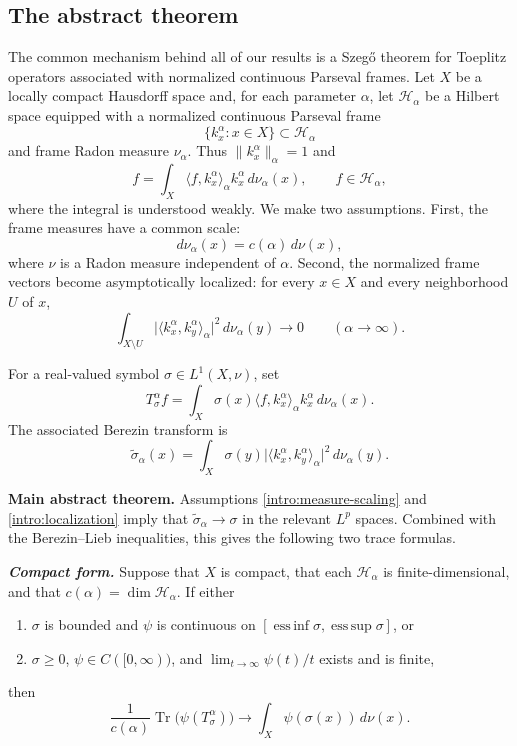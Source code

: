 \documentclass{amsart}
\theoremstyle{definition}
\theoremstyle{remark}
\numberwithin{equation}{section}
\begin{document}
\subsection{The abstract theorem}

The common mechanism behind all of our results is a Szeg\H{o} theorem for
Toeplitz operators associated with normalized continuous Parseval frames.
Let $X$ be a locally compact Hausdorff space and, for each parameter
$\alpha$, let $\mathcal{H}_\alpha$ be a Hilbert space equipped with a normalized
continuous Parseval frame
\[
  \{k_x^\alpha:x\in X\}\subset \mathcal{H}_\alpha
\]
and frame Radon measure $\nu_\alpha$.  Thus $\|k_x^\alpha\|_\alpha=1$ and
\[
  f=\int_X \langle f,k_x^\alpha\rangle_\alpha k_x^\alpha\,d\nu_\alpha(x),
  \qquad f\in \mathcal{H}_\alpha,
\]
where the integral is understood weakly.  We make two assumptions.
First, the frame measures have a common scale:
\begin{equation}
  d\nu_\alpha(x)=c(\alpha)\,d\nu(x),
  \label{intro:measure-scaling}
\end{equation}
where $\nu$ is a Radon measure independent of $\alpha$.  Second, the normalized frame
vectors become asymptotically localized: for every $x\in X$ and every
neighborhood $U$ of $x$,
\begin{equation}
  \int_{X\setminus U}
  \bigl|\langle k_x^\alpha,k_y^\alpha\rangle_\alpha\bigr|^2
  \,d\nu_\alpha(y)\longrightarrow 0
  \qquad (\alpha\to\infty).
  \label{intro:localization}
\end{equation}

For a real-valued symbol $\sigma\in L^1(X,\nu)$, set
\[
  T_\sigma^\alpha f
  =\int_X \sigma(x)\langle f,k_x^\alpha\rangle_\alpha
  k_x^\alpha\,d\nu_\alpha(x).
\]
The associated Berezin transform is
\[
  \widetilde\sigma_\alpha(x)
  =\int_X \sigma(y)
  \bigl|\langle k_x^\alpha,k_y^\alpha\rangle_\alpha\bigr|^2
  \,d\nu_\alpha(y).
\]

\medskip
\noindent\textbf{Main abstract theorem.}
Assumptions \eqref{intro:measure-scaling} and
\eqref{intro:localization} imply that
$\widetilde\sigma_\alpha\to\sigma$ in the relevant $L^p$ spaces.  Combined
with the Berezin--Lieb inequalities, this gives the following two trace
formulas.

\smallskip
\noindent\textbf{\emph{Compact form.}}
Suppose that $X$ is compact, that each $\mathcal{H}_\alpha$ is finite-dimensional, and
that $c(\alpha)=\dim \mathcal{H}_\alpha$.  If either
\begin{enumerate}
  \item $\sigma$ is bounded and $\psi$ is continuous on
  $[\operatorname*{ess\,inf}\sigma,\operatorname*{ess\,sup}\sigma]$, or
  \item $\sigma\geq 0$, $\psi\in C([0,\infty))$, and
  $\lim_{t\to\infty}\psi(t)/t$ exists and is finite,
\end{enumerate}
then
\begin{equation}
  \frac{1}{c(\alpha)}\operatorname{Tr}\bigl(\psi(T_\sigma^\alpha)\bigr)
  \longrightarrow
  \int_X\psi(\sigma(x))\,d\nu(x).
  \label{intro:compact-szego}
\end{equation}
\end{document}
